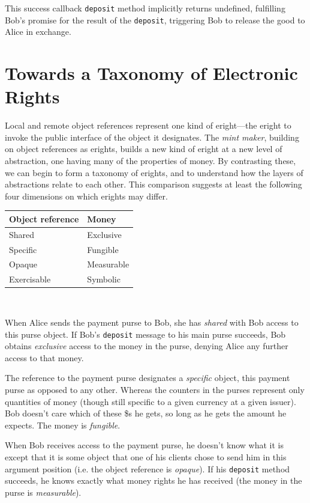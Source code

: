 \documentclass{llncs}
\begin{document}
This success callback {\tt deposit} method implicitly returns undefined, fulfilling Bob's promise for the result of the {\tt deposit}, triggering Bob to release the good to Alice in exchange.


\section{Towards a Taxonomy of Electronic Rights}

Local and remote object references represent one kind of eright---the eright to invoke the public interface of the object it designates. The \emph{mint maker}, building on object references as erights, builds a new kind of eright at a new level of abstraction, one having many of the properties of money. By contrasting these, we can begin to form a taxonomy of erights, and to understand how the layers of abstractions relate to each other. This comparison suggests at least the following four dimensions on which erights may differ.

\begin{center}
\begin{tabular}{ l|l }
  Object reference & Money \\ \hline
  Shared & Exclusive \\
  Specific & Fungible \\
  Opaque & Measurable \\
  Exercisable & Symbolic \\
\end{tabular}\\
\end{center}

When Alice sends the payment purse to Bob, she has \emph{shared} with Bob access to this purse object. If Bob's {\tt deposit} message to his main purse succeeds, Bob obtains \emph{exclusive} access to the money in the purse, denying Alice any further access to that money.

The reference to the payment purse designates a \emph{specific} object, this payment purse as opposed to any other. Whereas the counters in the purses represent only quantities of money (though still specific to a given currency at a given issuer). Bob doesn't care which of these \$s he gets, so long as he gets the amount he expects. The money is \emph{fungible}.

When Bob receives access to the payment purse, he doesn't know what it is except that it is some object that one of his clients chose to send him in this argument position (i.e. the object reference is \emph{opaque}). If his {\tt deposit} method succeeds, he knows exactly what money rights he has received (the money in the purse is \emph{measurable}).
\end{document}
